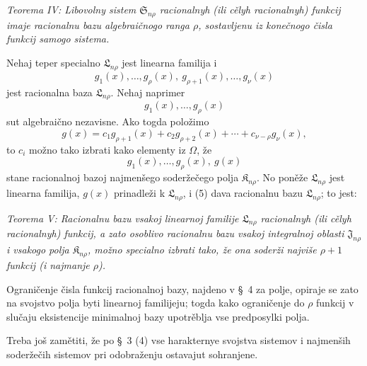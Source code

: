 \documentclass[11pt]{article}
\providecommand{\Kfield}{\mathfrak{K}}
\providecommand{\Ssys}{\mathfrak{S}}
\providecommand{\Jdom}{\mathfrak{J}}
\providecommand{\Lsys}{\mathfrak{L}}
\begin{document}
{\itshape Teorema IV: Libovolny sistem $\Ssys_{n\rho}$ racionalnyh (ili cělyh racionalnyh) funkcij imaje racionalnu bazu algebraičnogo ranga $\rho$, sostavljenu iz konečnogo čisla funkcij samogo sistema.}

Nehaj teper specialno $\Lsys_{n\rho}$ jest linearna familija i
\begin{equation}
  g_1(x),\ldots,g_\rho(x),\ g_{\rho+1}(x),\ldots,g_\nu(x)
\tag{4}
\end{equation}
jest racionalna baza $\Lsys_{n\rho}$. Nehaj naprimer
\[
  g_1(x),\ldots,g_\rho(x)
\]
sut algebraično nezavisne. Ako togda položimo
\[
  g(x)=c_1g_{\rho+1}(x)+c_2g_{\rho+2}(x)+\cdots+c_{\nu-\rho}g_\nu(x),
\]
to $c_i$ možno tako izbrati kako elementy iz $\Omega$, že
\begin{equation}
  g_1(x),\ldots,g_\rho(x),\ g(x)
\tag{5}
\end{equation}
stane racionalnoj bazoj najmenšego soderžečego polja $\Kfield_{n\rho}$. No poněže $\Lsys_{n\rho}$ jest linearna familija, $g(x)$ prinadleži k $\Lsys_{n\rho}$, i (5) dava racionalnu bazu $\Lsys_{n\rho}$; to jest:

{\itshape Teorema V: Racionalnu bazu vsakoj linearnoj familije $\Lsys_{n\rho}$ racionalnyh (ili cělyh racionalnyh) funkcij, a zato osoblivo racionalnu bazu vsakoj integralnoj oblasti $\Jdom_{n\rho}$ i vsakogo polja $\Kfield_{n\rho}$, možno specialno izbrati tako, že ona soderži najviše $\rho+1$ funkcij (i najmanje $\rho$).}

Ograničenje čisla funkcij racionalnoj bazy, najdeno v \S\ 4 za polje, opiraje se zato na svojstvo polja byti linearnoj familijeju; togda kako ograničenje do $\rho$ funkcij v slučaju eksistencije minimalnoj bazy upotrěblja vse predposylki polja.

Treba još zamětiti, že po \S\ 3 (4) vse harakternye svojstva sistemov i najmenših soderžečih sistemov pri odobraženju ostavajut sohranjene.
\end{document}
